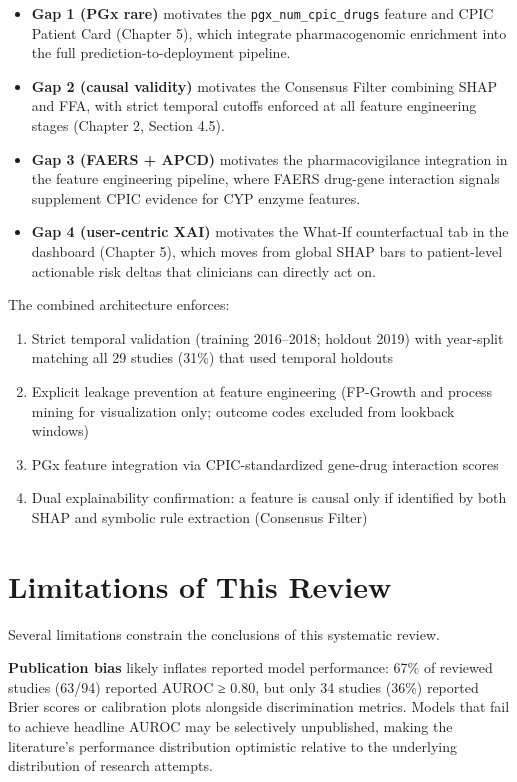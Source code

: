 \documentclass[
  12pt,
]{book}
\providecommand{\tightlist}{%
  \setlength{\itemsep}{0pt}\setlength{\parskip}{0pt}}
\begin{document}
\begin{itemize}
\tightlist
\item
  \textbf{Gap 1 (PGx rare)} motivates the \texttt{pgx\_num\_cpic\_drugs}
  feature and CPIC Patient Card (Chapter 5), which integrate
  pharmacogenomic enrichment into the full prediction-to-deployment
  pipeline.
\item
  \textbf{Gap 2 (causal validity)} motivates the Consensus Filter
  combining SHAP and FFA, with strict temporal cutoffs enforced at all
  feature engineering stages (Chapter 2, Section 4.5).
\item
  \textbf{Gap 3 (FAERS + APCD)} motivates the pharmacovigilance
  integration in the feature engineering pipeline, where FAERS drug-gene
  interaction signals supplement CPIC evidence for CYP enzyme features.
\item
  \textbf{Gap 4 (user-centric XAI)} motivates the What-If counterfactual
  tab in the dashboard (Chapter 5), which moves from global SHAP bars to
  patient-level actionable risk deltas that clinicians can directly act
  on.
\end{itemize}

The combined architecture enforces:

\begin{enumerate}
\def\labelenumi{\arabic{enumi}.}
\tightlist
\item
  Strict temporal validation (training 2016--2018; holdout 2019) with
  year-split matching all 29 studies (31\%) that used temporal holdouts
\item
  Explicit leakage prevention at feature engineering (FP-Growth and
  process mining for visualization only; outcome codes excluded from
  lookback windows)
\item
  PGx feature integration via CPIC-standardized gene-drug interaction
  scores
\item
  Dual explainability confirmation: a feature is causal only if
  identified by both SHAP and symbolic rule extraction (Consensus
  Filter)
\end{enumerate}

\section{Limitations of This Review}\label{limitations-of-this-review}

Several limitations constrain the conclusions of this systematic review.

\textbf{Publication bias} likely inflates reported model performance:
67\% of reviewed studies (63/94) reported AUROC ≥ 0.80, but only 34
studies (36\%) reported Brier scores or calibration plots alongside
discrimination metrics. Models that fail to achieve headline AUROC may
be selectively unpublished, making the literature's performance
distribution optimistic relative to the underlying distribution of
research attempts.
\end{document}
